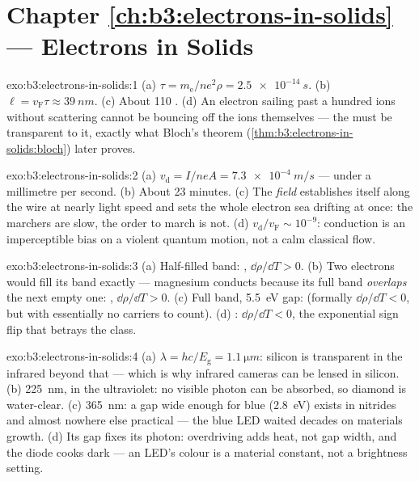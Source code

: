 \section*{Chapter \ref{ch:b3:electrons-in-solids} --- Electrons in Solids}

\begin{solution}{exo:b3:electrons-in-solids:1}
(a) $\tau = m_{\text{e}}/ne^2\rho = \qty{2.5e-14}{s}$. (b) $\ell =
v_{\text{F}}\tau \approx \qty{39}{nm}$. (c) About 110 . (d) An electron sailing past a hundred ions without
scattering cannot be bouncing off the ions themselves --- the
 must be transparent to it, exactly what Bloch's theorem
(\cref{thm:b3:electrons-in-solids:bloch}) later proves.
\end{solution}

\begin{solution}{exo:b3:electrons-in-solids:2}
(a) $v_{\text{d}} = I/neA = \qty{7.3e-4}{m/s}$ --- under a
millimetre per second. (b) About 23 minutes. (c) The \emph{field}
establishes itself along the wire at nearly light speed and sets
the whole electron sea drifting at once: the marchers are slow,
the order to march is not. (d) $v_{\text{d}}/v_{\text{F}} \sim
10^{-9}$: conduction is an imperceptible bias on a violent
quantum motion, not a calm classical flow.
\end{solution}

\begin{solution}{exo:b3:electrons-in-solids:3}
(a) Half-filled band: , $\dd\rho/\dd T > 0$. (b) Two
electrons would fill its band exactly --- magnesium conducts
because its full band \emph{overlaps} the next empty one: ,
$\dd\rho/\dd T > 0$. (c) Full band, \qty{5.5}{eV} gap: 
(formally $\dd\rho/\dd T < 0$, but with essentially no carriers
to count). (d) : $\dd\rho/\dd T < 0$, the
exponential sign flip that betrays the class.
\end{solution}

\begin{solution}{exo:b3:electrons-in-solids:4}
(a) $\lambda = hc/E_{\text{g}} = \qty{1.1}{\micro m}$: silicon is
transparent in the infrared beyond that --- which is why infrared
cameras can be lensed in silicon. (b) \qty{225}{nm}, in the
ultraviolet: no visible photon can be absorbed, so diamond is
water-clear. (c) \qty{365}{nm}: a gap wide enough for blue
(\qty{2.8}{eV}) exists in nitrides and almost nowhere else
practical --- the blue LED waited decades on materials growth.
(d) Its gap fixes its photon: overdriving adds heat, not gap
width, and the diode cooks dark --- an LED's colour is a
material constant, not a brightness setting.
\end{solution}

